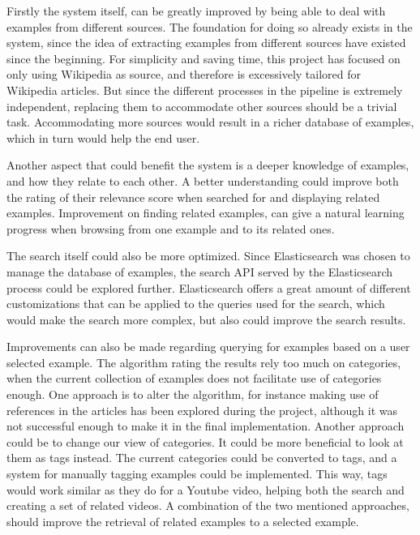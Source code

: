 Firstly the system itself, can be greatly improved by being able to deal with examples from different sources. The foundation for doing so already exists in the system, since the idea of extracting examples from different sources have existed since the beginning. For simplicity and saving time, this project has focused on only using Wikipedia as source, and therefore is excessively tailored for Wikipedia articles. But since the different processes in the pipeline is extremely independent, replacing them to accommodate other sources should be a trivial task. Accommodating more sources would result in a richer database of examples, which in turn would help the end user.

Another aspect that could benefit the system is a deeper knowledge of examples, and how they relate to each other. A better understanding could improve both the rating of their relevance score when searched for and displaying related examples. Improvement on finding related examples, can give a natural learning progress when browsing from one example and to its related ones.

The search itself could also be more optimized. Since Elasticsearch was chosen to manage the database of examples, the search API served by the Elasticsearch process could be explored further. Elasticsearch offers a great amount of different customizations that can be applied to the queries used for the search, which would make the search more complex, but also could improve the search results.

Improvements can also be made regarding querying for examples based on a user selected example. The algorithm rating the results rely too much on categories, when the current collection of examples does not facilitate use of categories enough. One approach is to alter the algorithm, for instance making use of references in the articles has been explored during the project, although it was not successful enough to make it in the final implementation. Another approach could be to change our view of categories. It could be more beneficial to look at them as tags instead. The current categories could be converted to tags, and a system for manually tagging examples could be implemented. This way, tags would work similar as they do for a Youtube video, helping both the search and creating a set of related videos. A combination of the two mentioned approaches, should improve the retrieval of related examples to a selected example.


\cleardoublepage